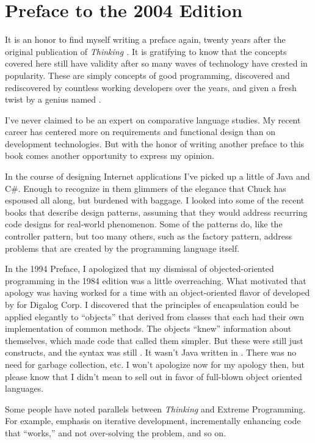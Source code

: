\chapter*{Preface to the 2004 Edition}\label{preface2004}
\pagestyle{headings}

\initial It is an honor to find myself writing a preface again, twenty years
after the original publication of \emph{Thinking \Forth{}.} It is gratifying to
know that the concepts covered here still have validity after so many
waves of technology have crested in popularity. These are simply
concepts of good programming, discovered and rediscovered by countless
working developers over the years, and given a fresh twist by a genius
named .

I've never claimed to be an expert on comparative language studies. My
recent career has centered more on requirements and functional design
than on development technologies. But with the honor of writing
another preface to this book comes another opportunity to express my
opinion.

In the course of designing Internet applications I've picked up a
little of Java and C\#. Enough to recognize in them glimmers of the
elegance that Chuck has espoused all along, but burdened with
baggage. I looked into some of the recent books that describe design
patterns, assuming that they would address recurring code designs for
real-world phenomenon. Some of the patterns do, like the controller
pattern, but too many others, such as the factory pattern, address
problems that are created by the programming language itself.

In the 1994 Preface, I apologized that my dismissal of
objected-oriented programming in the 1984 edition was a little
overreaching. What motivated that apology was having worked for a time
with an object-oriented flavor of \Forth{} developed by  for Digalog Corp. I discovered that the principles of
encapsulation could be applied elegantly to \Forth{} ``objects'' that
derived from classes that each had their own implementation of common
methods. The objects ``knew'' information about themselves, which made
code that called them simpler. But these were still just \Forth{}
constructs, and the syntax was still \Forth{}. It wasn't Java written
in \Forth{}. There was no need for garbage collection, etc. I won't
apologize now for my apology then, but please know that I didn't mean
to sell out in favor of full-blown object oriented languages.

Some people have noted parallels between \emph{Thinking \Forth{}} and
Extreme Programming. For example, emphasis on iterative development,
incrementally enhancing code that ``works,'' and not over-solving the
problem, and so on.

